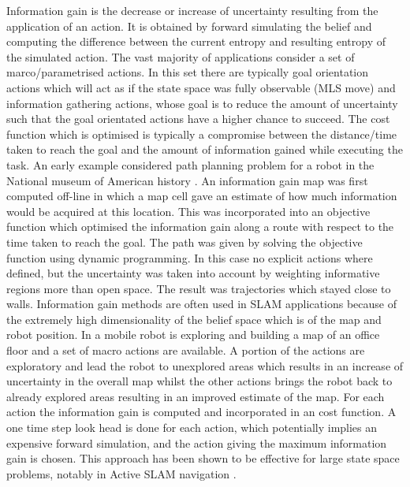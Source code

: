 Information gain is the decrease or increase of uncertainty resulting from the application of an action. It is obtained by forward simulating the belief and computing the difference between the current entropy and resulting entropy of the simulated action. The vast majority of applications consider a set of marco/parametrised actions.
In this set there are typically goal orientation actions which will act as if the state space was fully observable (MLS move) and information gathering actions, 
whose goal is to reduce the amount of uncertainty such that the goal orientated actions have a higher chance to succeed. The cost function which is optimised 
is typically a compromise between the distance/time taken to reach the goal and the amount of information gained 
while executing the task. An early example considered path planning problem for a robot in the National museum of American history \cite{CostalNavigation1999}. An information gain map was first computed 
off-line in which a map cell gave an estimate of how much information would be acquired at this location. This was incorporated into an objective function 
which optimised the information gain along a route with respect to the time taken to reach the goal. The path was 
given by solving the objective function using dynamic programming. In this case no explicit actions where defined, but the uncertainty was taken into account by 
weighting informative regions more than open space. The result was trajectories which stayed close to walls.
Information gain methods are often used in SLAM applications because of the extremely high dimensionality of the belief space which is of the map and robot position. In \cite{stachniss05robotics} a mobile robot is exploring 
and building a map of an office floor and a set of macro actions are available. A portion of the actions are exploratory and 
lead the robot to unexplored areas which results in an increase of uncertainty in the overall map whilst the other actions brings the robot back to already
explored areas resulting in an improved estimate of the map. For each action the information gain is computed and incorporated in an cost function. A one time step look head 
is done for each action, which potentially implies an expensive forward simulation, and the action giving the maximum information gain is chosen. This approach
has been shown to be effective for large state space problems, notably in Active SLAM navigation \cite{dense_entropy_icra_2014}.

